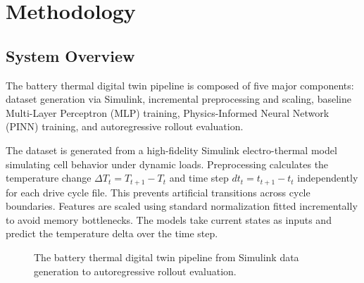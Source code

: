 \section{Methodology}

\subsection{System Overview}
The battery thermal digital twin pipeline is composed of five major components: dataset generation via Simulink, incremental preprocessing and scaling, baseline Multi-Layer Perceptron (MLP) training, Physics-Informed Neural Network (PINN) training, and autoregressive rollout evaluation. 

The dataset is generated from a high-fidelity Simulink electro-thermal model simulating cell behavior under dynamic loads. Preprocessing calculates the temperature change $\Delta T_t = T_{t+1} - T_t$ and time step $dt_t = t_{t+1} - t_t$ independently for each drive cycle file. This prevents artificial transitions across cycle boundaries. Features are scaled using standard normalization fitted incrementally to avoid memory bottlenecks. The models take current states as inputs and predict the temperature delta over the time step.

\begin{figure}[htbp]
\centering
{}
\caption{The battery thermal digital twin pipeline from Simulink data generation to autoregressive rollout evaluation.}
\label{fig:pipeline}
\end{figure}

